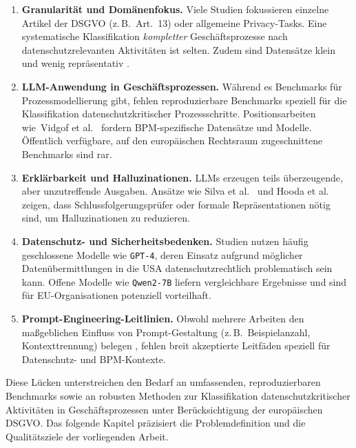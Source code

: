 \begin{enumerate}
    \item \textbf{Granularität und Domänenfokus.} Viele Studien fokussieren einzelne Artikel der \ac{DSGVO} (z.\,B.\ Art.~13) oder allgemeine Privacy-Tasks. Eine systematische Klassifikation \emph{kompletter} Geschäftsprozesse nach datenschutzrelevanten Aktivitäten ist selten. Zudem sind Datensätze klein und wenig repräsentativ \cite{nake2023towards}.
    \item \textbf{\ac{LLM}-Anwendung in Geschäftsprozessen.} Während es Benchmarks für Prozessmodellierung gibt, fehlen reproduzierbare Benchmarks speziell für die Klassifikation datenschutzkritischer Prozessschritte. Positionsarbeiten wie\linebreak~Vidgof et al.\ \cite{vidgof2023largelanguagemodelsbusiness} fordern \ac{BPM}-spezifische Datensätze und Modelle. Öffentlich verfügbare, auf den europäischen Rechtsraum zugeschnittene Benchmarks sind rar.
    \item \textbf{Erklärbarkeit und Halluzinationen.} \acp{LLM} erzeugen teils überzeugende, aber unzutreffende Ausgaben. Ansätze wie Silva et al.\ \cite{silva2024entailment} und Hooda et al.\ \cite{hooda2024policylr} zeigen, dass Schlussfolgerungsprüfer oder formale Repräsentationen nötig sind, um Halluzinationen zu reduzieren.
    \item \textbf{Datenschutz- und Sicherheitsbedenken.} Studien nutzen häufig geschlossene Modelle wie \texttt{GPT-4}, deren Einsatz aufgrund möglicher Datenübermittlungen in die USA datenschutzrechtlich problematisch sein kann. Offene Modelle wie \texttt{Qwen2-7B} liefern vergleichbare Ergebnisse \cite{schwerin2024systematic} und sind für \ac{EU}-Organisationen potenziell vorteilhaft.
    \item \textbf{Prompt-Engineering-Leitlinien.} Obwohl mehrere Arbeiten den maßgeblichen Einfluss von Prompt-Gestaltung (z.\,B.\ Beispielanzahl, Kontexttrennung) belegen \cite{pragyan2024toward, liu2023prompting}, fehlen breit akzeptierte Leitfäden speziell für Datenschutz- und \ac{BPM}-Kontexte.
\end{enumerate}

Diese Lücken unterstreichen den Bedarf an umfassenden, reproduzierbaren Benchmarks sowie an robusten Methoden zur Klassifikation datenschutzkritischer Aktivitäten in Geschäftsprozessen unter Berücksichtigung der europäischen \ac{DSGVO}. Das folgende Kapitel präzisiert die Problemdefinition und die Qualitätsziele der vorliegenden Arbeit.
